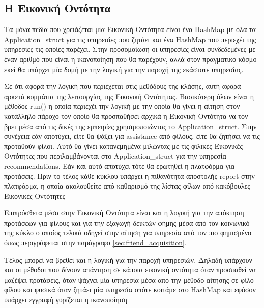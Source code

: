 

\subsection{H Εικονική Οντότητα}

Τα μόνα πεδία που χρειάζεται μία Εικονική Οντότητα είναι ένα HashMap με όλα τα\\
 Application\_struct για τις υπηρεσίες που ζητάει και ένα HashMap που περιεχέι της υπηρεσίες τις οποίες παρέχει.
 Στην προσομοίωση οι υπηρεσίες είναι συνδεδεμένες με έναν αριθμό που είναι η ικανοποίηση που θα παρέχουν, αλλά στον πραγματικό κόσμο εκεί θα υπάρχει μία δομή με την λογική για την παροχή της εκάστοτε υπηρεσίας.

Σε ότι αφορά την λογική που περιέχεται στις μεθόδους της κλάσης, αυτή αφορά αρκετά κομμάτια της λειτουργίας της Εικονική Οντότητας. 
Βασικότερη όλων είναι η μέθοδος run() η οποία περιεχέι την λογική με την οποία θα γίνει η αίτηση στον κατάλληλο πάροχο τον οποίο θα προσπαθήσει αρχικά η Εικονική Οντότητα να τον βρει μέσα από τις δικές της εμπειρίες χρησιμοποιώντας το Application\_struct. 
 Στην συνέχεια εάν αποτύχει, είτε θα ψάξει για assistance από φίλους, είτε θα ζητήσει να τις προταθούν φίλοι. 
 Αυτό θα γίνει κατανεμημένα μιλώντας με τις φιλικές Εικονικές Οντότητες που περιλαμβάνονται στο Application\_struct για την υπηρεσία recommendations.
 Εάν και αυτό αποτύχει τότε θα ερωτηθεί η πλατφόρμα για προτάσεις. 
 Πριν το τέλος κάθε κύκλου υπάρχει η πιθανότητα αποστολής report στην πλατφόρμα, η οποία ακολουθείτε από καθαρισμό της λίστας φίλων από κακόβουλες Εικονικές Οντότητες 
 

Επιπρόσθετα μέσα στην Εικονική Οντότητα είναι και η λογική για την απόκτηση προτάσεων για φίλους και για την εξαγωγή δεικτών φήμης μέσα από τον κοινωνικό της κύκλο ο οποίος τελικά οδηγεί στην αίτηση για υπηρεσία από τον πιο φημισμένο όπως περιγράφεται στην παράγραφο  \ref{sec:friend_acquisition}.


Τέλος μπορεί να βρεθεί και η λογική για την παροχή υπηρεσιών. Δηλαδή υπάρχουν και οι μέθοδοι που δίνουν απάντηση σε κάποια εικονική οντότητα όταν προσπαθεί να μαζέψει προτάσεις, όταν ψάχνει μία υπηρεσία μέσα από την μέθοδο αίτησης σε φίλο φίλου και φυσικά όταν ζητάει μία υπηρεσία οπότε κοιτάμε στο HashMap και εφόσον υπάρχει εγγραφή γυρίζεται η ικανοποίηση
\newpage
